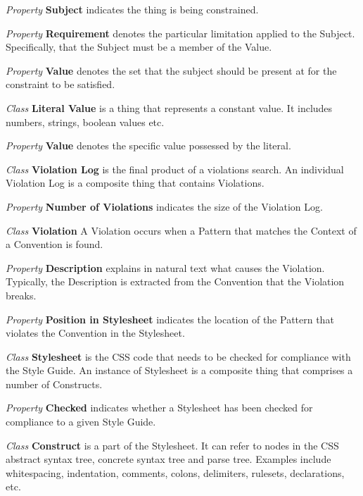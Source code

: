 \documentclass[parskip=full]{uvamscse}
\begin{document}
\begin{description}
\textit{Property} \textbf{Subject} indicates the thing is being constrained.

\textit{Property} \textbf{Requirement} denotes the particular limitation applied to the Subject. Specifically, that the Subject must be a member of the Value.

\textit{Property} \textbf{Value} denotes the set that the subject should be present at for the constraint to be satisfied.


\item\textit{Class} \textbf{Literal Value} is a thing that represents a constant value. It includes numbers, strings, boolean values etc.

\textit{Property} \textbf{Value} denotes the specific value possessed by the literal.


\item\textit{Class} \textbf{Violation Log} is the final product of a violations search. An individual Violation Log is a composite thing that contains Violations.

\textit{Property} \textbf{Number of Violations} indicates the size of the Violation Log. 


\item\textit{Class} \textbf{Violation} A Violation occurs when a Pattern that matches the Context of a Convention is found.

\textit{Property} \textbf{Description} explains in natural text what causes the Violation. Typically, the Description is extracted from the Convention that the Violation breaks.

\textit{Property} \textbf{Position in Stylesheet} indicates the location of the Pattern that violates the Convention in the Stylesheet. 


\item\textit{Class} \textbf{Stylesheet} is the CSS code that needs to be checked for compliance with the Style Guide. An instance of Stylesheet is a composite thing that comprises a number of Constructs.

\textit{Property} \textbf{Checked} indicates whether a Stylesheet has been checked for compliance to a given Style Guide. 


\item\textit{Class} \textbf{Construct} is a part of the Stylesheet. It can refer to nodes in the CSS abstract syntax tree, concrete syntax tree and parse tree. Examples include whitespacing, indentation, comments, colons, delimiters, rulesets, declarations, etc.


\end{description}
\end{document}
